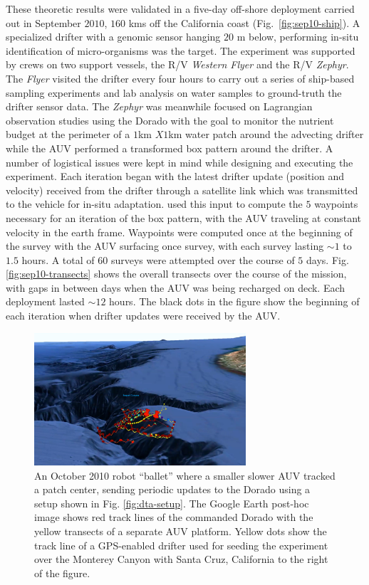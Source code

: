 These theoretic results were validated in a five-day
off-shore deployment carried out in September $2010$, $160$ kms off
the California coast (Fig.~\ref{fig:sep10-ship}). A specialized
drifter with a genomic sensor \cite{scholin09} hanging $20$ m below,
performing in-situ identification of micro-organisms was the
target. The experiment was supported by crews on two support vessels,
the R/V \emph{Western Flyer} and the R/V \emph{Zephyr}. The
\emph{Flyer} visited the drifter every four hours to carry out a
series of ship-based sampling experiments and lab analysis on water
samples to ground-truth the drifter sensor data. The \emph{Zephyr} was
meanwhile focused on Lagrangian observation studies using the Dorado
with the goal to monitor the nutrient budget at the perimeter of a
$1$km $X 1$km water patch around the advecting drifter while the AUV
performed a transformed box pattern around the drifter. A number of
logistical issues were kept in mind while designing and executing the
experiment. Each iteration began with the latest drifter update
(position and velocity) received from the drifter through a satellite
link which was transmitted to the vehicle for in-situ adaptation. \rx
used this input to compute the $5$ waypoints necessary for an
iteration of the box pattern, with the AUV traveling at constant
velocity in the earth frame. Waypoints were computed once at the
beginning of the survey with the AUV surfacing once  survey, with each survey lasting $\sim1$ to $1.5$ hours. A
total of $60$ surveys were attempted over the course of $5$
days. Fig. \ref{fig:sep10-transects} shows the overall transects over
the course of the mission, with gaps in between days when the AUV was
being recharged on deck. Each deployment lasted $\sim12$ hours. The
black dots in the figure show the beginning of each iteration when
drifter updates were received by the AUV.


\begin{figure}[t]
\centering
\includegraphics[width=0.7\textwidth]{figs/oct10-ballet.pdf}
\caption{\small An October 2010 robot ``ballet'' where a smaller
  slower AUV tracked a patch center, sending periodic updates to the
  Dorado using a setup shown in Fig. \ref{fig:dta-setup}. The Google
  Earth post-hoc image shows {\color{red}red} track lines of the \rx
  commanded Dorado with the {\color{yellow}yellow} transects of a
  separate AUV platform. {\color{yellow}Yellow} dots show the track
  line of a GPS-enabled drifter used for seeding the experiment over
  the Monterey Canyon with Santa Cruz, California to the right of the
  figure.}
\label{fig:ballet}
\end{figure}

